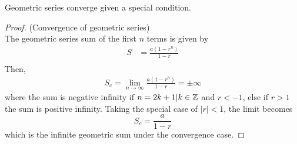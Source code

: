 Geometric series converge given a special condition.
\begin{proof} (Convergence of geometric series)\\
    The geometric series sum of the first $n$ terms is given by
    \begin{align*}
        S&=\frac{a(1-r^n)}{1-r}\\
    \end{align*}
    Then,
    \begin{align*}
        S_c=\lim_{n\to\infty}\frac{a(1-r^n)}{1-r}=\pm\infty
    \end{align*}
    where the sum is negative infinity if $n=2k+1|k\in\mathbb{Z}$ and $r<-1$,
    else if $r>1$ the sum is positive infinity.
    Taking the special case of $|r|<1$, the limit becomes
    \begin{equation*}
        S_c=\frac{a}{1-r}
    \end{equation*}
    which is the infinite geometric sum under the convergence case.
\end{proof}